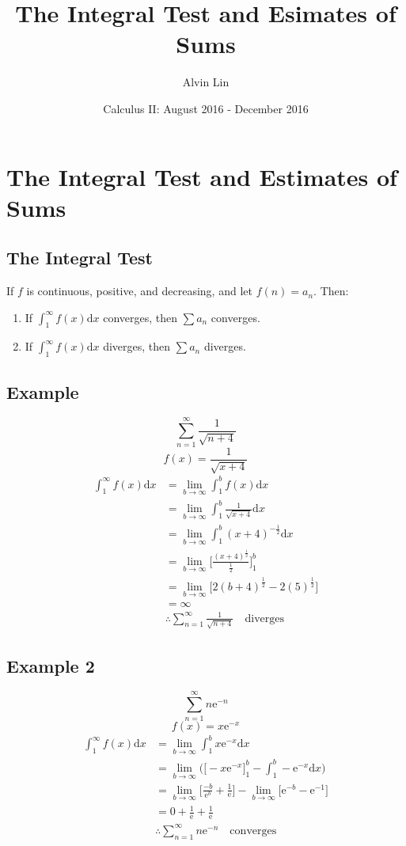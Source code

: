 \documentclass[letterpaper, 12pt]{article}
\title{The Integral Test and Esimates of Sums}
\author{Alvin Lin}
\date{Calculus II: August 2016 - December 2016}
\newcommand*{\diff}{\mathrm{d}}
\newcommand*{\e}{\mathrm{e}}
\begin{document}
\maketitle

\section*{The Integral Test and Estimates of Sums}

\subsection*{The Integral Test}
If \( f \) is continuous, positive, and decreasing, and let \( f(n) = a_{n} \).
Then:
\begin{enumerate}
  \item If \( \int_{1}^{\infty}f(x)\diff{x} \) converges, then
    \( \sum{a_{n}} \) converges.
  \item If \( \int_{1}^{\infty}f(x)\diff{x} \) diverges, then
    \( \sum{a_{n}} \) diverges.
\end{enumerate}

\subsection*{Example}
\[ \sum_{n=1}^{\infty}\frac{1}{\sqrt{n+4}} \]
\[ f(x) = \frac{1}{\sqrt{x+4}} \]
\begin{align*}
  \int_{1}^{\infty}f(x)\diff{x} &=
    \lim_{b\to\infty}\int_{1}^{b}f(x)\diff{x} \\
  &= \lim_{b\to\infty}\int_{1}^{b}\frac{1}{\sqrt{x+4}}\diff{x} \\
  &= \lim_{b\to\infty}\int_{1}^{b}(x+4)^{-\frac{1}{2}}\diff{x} \\
  &= \lim_{b\to\infty}\bigg[
    \frac{(x+4)^{\frac{1}{2}}}{\frac{1}{2}}\bigg]_{1}^{b} \\
  &= \lim_{b\to\infty}\bigg[2(b+4)^{\frac{1}{2}}-2(5)^{\frac{1}{2}}] \\
  &= \infty \\
  & \therefore \sum_{n=1}^{\infty}\frac{1}{\sqrt{n+4}} \quad \mathrm{diverges}
\end{align*}

\subsection*{Example 2}
\[ \sum_{n=1}^{\infty}n\e^{-n} \]
\[ f(x) = x\e^{-x} \]
\begin{align*}
  \int_{1}^{\infty}f(x)\diff{x} &=
    \lim_{b\to\infty}\int_{1}^{b}x\e^{-x}\diff{x} \\
  &= \lim_{b\to\infty}\bigg(\big[-x\e^{-x}\big]_{1}^{b}-
    \int_{1}^{b}-\e^{-x}\diff{x}\bigg) \\
  &= \lim_{b\to\infty}\bigg[\frac{-b}{\e^{b}}+\frac{1}{\e}\bigg]-
    \lim_{b\to\infty}\bigg[\e^{-b}-\e^{-1}\bigg] \\
  &= 0+\frac{1}{\e}+\frac{1}{\e} \\
  & \therefore \sum_{n=1}^{\infty}n\e^{-n} \quad \mathrm{converges}
\end{align*}
\end{document}
